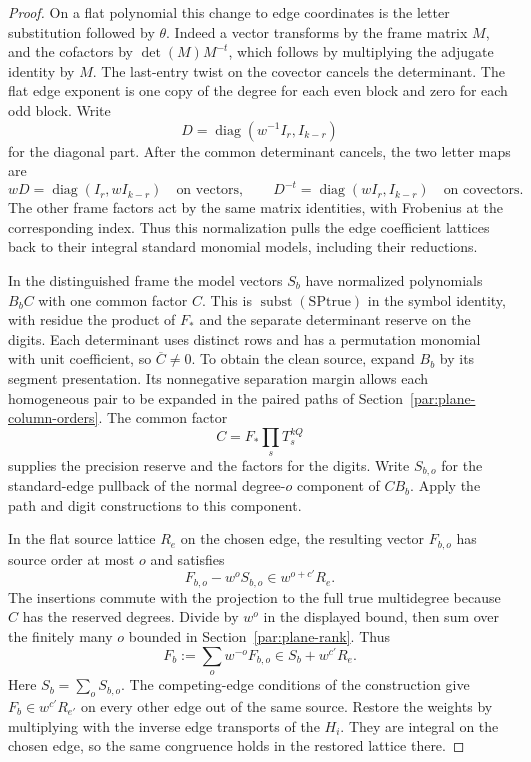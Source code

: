 \begin{proof}
On a flat polynomial this change to edge
coordinates is the letter substitution followed by \(\theta\).
Indeed a vector transforms by the frame matrix \(M\), and the
cofactors by \(\det(M)M^{-t}\), which follows by multiplying
the adjugate identity by \(M\). The last-entry twist on the
covector cancels the determinant. The flat edge exponent is
one copy of the degree for each even block and zero for each
odd block. Write
\[
 D=\operatorname{diag}(w^{-1}I_r,I_{k-r})
\]
for the diagonal
part. After the common determinant cancels, the two letter maps are
\[
 wD=\operatorname{diag}(I_r,wI_{k-r})\quad\text{on vectors},\qquad
 D^{-t}=\operatorname{diag}(wI_r,I_{k-r})\quad\text{on covectors}.
\] The
other frame factors act by the same matrix identities, with
Frobenius at the corresponding index. Thus this normalization
pulls the edge coefficient lattices back to their integral
standard monomial models, including their reductions.

In the distinguished frame the model vectors \(S_b\) have
normalized polynomials \(B_b C\) with one common factor \(C\).
This is \(\operatorname{subst}(\mathrm{SPtrue})\) in the symbol
identity, with residue the product of \(F_*\) and the separate
determinant reserve on the digits. Each determinant uses distinct
rows and has a permutation monomial with unit coefficient, so
\(\overline C\ne0\). To obtain the clean source, expand \(B_b\)
by its segment presentation. Its nonnegative separation margin
allows each homogeneous pair to be expanded in the paired paths
of Section~\ref{par:plane-column-orders}. The common factor
\begin{equation}\label{eq:plane-clean-factor}
                 C=F_*\prod_s T_s^{kQ}
\end{equation}
supplies the precision reserve and the factors for the digits. Write \(S_{b,o}\) for the standard-edge pullback of the
normal degree-\(o\) component of \(C B_b\). Apply the path
and digit constructions to this component.

In the flat source
lattice \(R_e\) on the chosen edge, the resulting vector
\(F_{b,o}\) has source order at most \(o\) and satisfies
\[
                 F_{b,o}-w^o S_{b,o}\in w^{o+c'}R_e .
\]
The insertions commute with
the projection to the full true multidegree because \(C\)
has the reserved degrees. Divide by \(w^o\) in the displayed bound,
then sum over the finitely many \(o\) bounded in
Section~\ref{par:plane-rank}. Thus
\[
  F_b:=\sum_o w^{-o}F_{b,o}\in S_b+w^{c'}R_e .
\]
Here \(S_b=\sum_o S_{b,o}\). The competing-edge conditions
of the construction give \(F_b\in w^{c'}R_{e'}\) on every
other edge out of the same source. Restore the weights by multiplying
with the inverse edge transports of the \(H_i\). They are integral
on the chosen edge, so the same congruence holds in the restored
lattice there.


\end{proof}
